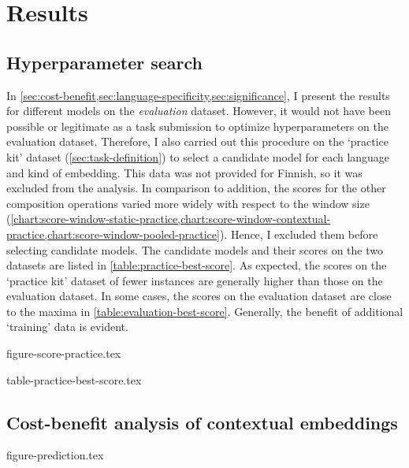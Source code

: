 \section{Results}
\label{sec:results}

\subsection{Hyperparameter search}
\label{sec:hyperparameter-search}

In \cref{sec:cost-benefit,sec:language-specificity,sec:significance}, I present the
results for different models on the \emph{evaluation} dataset.
However, it would not have been possible or legitimate as a task submission to optimize
hyperparameters on the evaluation dataset.
Therefore, I also carried out this procedure on the `practice kit' dataset
(\cref{sec:task-definition}) to select a candidate model for each language and kind of
embedding.
This data was not provided for Finnish, so it was excluded from the analysis.
In comparison to addition, the scores for the other composition operations varied more
widely with respect to the window size
(\cref{chart:score-window-static-practice,chart:score-window-contextual-practice,chart:score-window-pooled-practice}).
Hence, I excluded them before selecting candidate models.
The candidate models and their scores on the two datasets are listed in
\cref{table:practice-best-score}.
As expected, the scores on the `practice kit' dataset of fewer instances are generally
higher than those on the evaluation dataset.
In some cases, the scores on the evaluation dataset are close to the maxima in
\cref{table:evaluation-best-score}.
Generally, the benefit of additional `training' data is evident.

{figure-score-practice.tex}

{table-practice-best-score.tex}

\subsection{Cost-benefit analysis of contextual embeddings}
\label{sec:cost-benefit}

{figure-prediction.tex}

